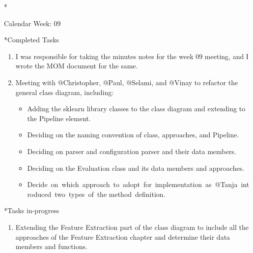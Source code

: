 \documentclass[11pt,a4paper]{article}
\begin{document}
\newpage
\begin{section}*{Calendar Week: 09 \hfill \date{05 March, 2021}}
 \begin{subsection}*{Completed Tasks}
     \begin{enumerate}
         \item I was responsible for taking the minutes notes for the week 09 meeting, and I wrote the MOM document for the same.
         \item Meeting with @Christopher, @Paul, @Selami, and @Vinay to refactor the general class diagram, including:
               \begin{itemize}
                   \item Adding the sklearn library classes to the class diagram and extending to the Pipeline element.
                   \item Deciding on the naming convention of class, approaches, and Pipeline.
                   \item Deciding on parser and configuration parser and their data members.
                   \item Deciding on the Evaluation class and its data members and approaches.
                   \item Decide on which approach to adopt for implementation as @Tanja introduced two types of the method definition.
               \end{itemize}
     \end{enumerate}
 \end{subsection}

 \begin{subsection}*{Tasks in-progress}
     \begin{enumerate}
         \item Extending the Feature Extraction part of the class diagram to include all the approaches of the Feature Extraction chapter and determine their data members and functions.
     \end{enumerate}
 \end{subsection}
\end{section}
\end{document}
